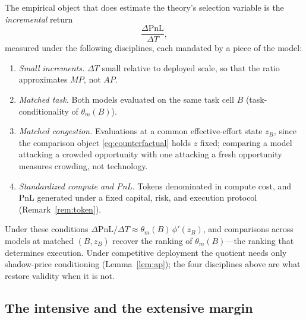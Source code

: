 \documentclass[11pt]{article}
\theoremstyle{definition}
\theoremstyle{remark}
\newcommand{\PnL}{\mathrm{PnL}}
\begin{document}
The empirical object that does estimate the theory's selection variable is the \emph{incremental} return
\begin{equation}
\frac{\Delta \PnL}{\Delta T},
\end{equation}
measured under the following disciplines, each mandated by a piece of the model:
\begin{enumerate}[itemsep=2pt]
\item \emph{Small increments.} $\Delta T$ small relative to deployed scale, so that the ratio approximates $MP$, not $AP$.
\item \emph{Matched task.} Both models evaluated on the same task cell $B$ (task-conditionality of $\theta_m(B)$).
\item \emph{Matched congestion.} Evaluations at a common effective-effort state $z_B$, since the comparison object \eqref{eq:counterfactual} holds $z$ fixed; comparing a model attacking a crowded opportunity with one attacking a fresh opportunity measures crowding, not technology.
\item \emph{Standardized compute and PnL.} Tokens denominated in compute cost, and PnL generated under a fixed capital, risk, and execution protocol (Remark~\ref{rem:token}).
\end{enumerate}
Under these conditions $\Delta\PnL/\Delta T \approx \theta_m(B)\,\phi'(z_B)$, and comparisons across models at matched $(B, z_B)$ recover the ranking of $\theta_m(B)$---the ranking that determines execution. Under competitive deployment the quotient needs only shadow-price conditioning (Lemma~\ref{lem:ap}); the four disciplines above are what restore validity when it is not.

\subsection{The intensive and the extensive margin}
\end{document}
